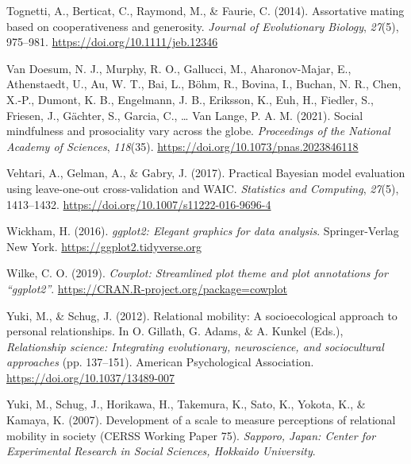 \documentclass[english,man,floatsintext]{apa6}
\begin{document}
\leavevmode\hypertarget{ref-Tognetti2014}{}%
Tognetti, A., Berticat, C., Raymond, M., \& Faurie, C. (2014). Assortative mating based on cooperativeness and generosity. \emph{Journal of Evolutionary Biology}, \emph{27}(5), 975--981. \url{https://doi.org/10.1111/jeb.12346}

\leavevmode\hypertarget{ref-VanDoesume2021}{}%
Van Doesum, N. J., Murphy, R. O., Gallucci, M., Aharonov-Majar, E., Athenstaedt, U., Au, W. T., Bai, L., Böhm, R., Bovina, I., Buchan, N. R., Chen, X.-P., Dumont, K. B., Engelmann, J. B., Eriksson, K., Euh, H., Fiedler, S., Friesen, J., Gächter, S., Garcia, C., \ldots{} Van Lange, P. A. M. (2021). Social mindfulness and prosociality vary across the globe. \emph{Proceedings of the National Academy of Sciences}, \emph{118}(35). \url{https://doi.org/10.1073/pnas.2023846118}

\leavevmode\hypertarget{ref-Vehtari2017}{}%
Vehtari, A., Gelman, A., \& Gabry, J. (2017). Practical Bayesian model evaluation using leave-one-out cross-validation and WAIC. \emph{Statistics and Computing}, \emph{27}(5), 1413--1432. \url{https://doi.org/10.1007/s11222-016-9696-4}

\leavevmode\hypertarget{ref-Wickham2016}{}%
Wickham, H. (2016). \emph{ggplot2: Elegant graphics for data analysis}. Springer-Verlag New York. \url{https://ggplot2.tidyverse.org}

\leavevmode\hypertarget{ref-Wilke2019}{}%
Wilke, C. O. (2019). \emph{Cowplot: Streamlined plot theme and plot annotations for ``ggplot2''}. \url{https://CRAN.R-project.org/package=cowplot}

\leavevmode\hypertarget{ref-Yuki2012}{}%
Yuki, M., \& Schug, J. (2012). Relational mobility: A socioecological approach to personal relationships. In O. Gillath, G. Adams, \& A. Kunkel (Eds.), \emph{Relationship science: Integrating evolutionary, neuroscience, and sociocultural approaches} (pp. 137--151). American Psychological Association. \url{https://doi.org/10.1037/13489-007}

\leavevmode\hypertarget{ref-Yuki2007}{}%
Yuki, M., Schug, J., Horikawa, H., Takemura, K., Sato, K., Yokota, K., \& Kamaya, K. (2007). Development of a scale to measure perceptions of relational mobility in society (CERSS Working Paper 75). \emph{Sapporo, Japan: Center for Experimental Research in Social Sciences, Hokkaido University}.

\endgroup

\newpage

\hypertarget{appendix-appendix}{%
\appendix}
\end{document}
